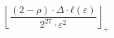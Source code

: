 \[\left\lfloor \frac{\left(2 - \rho\right) \cdot \Delta \cdot ℓ\left(\varepsilon\right)}{2^{27} \cdot \varepsilon^{2}} \right\rfloor_{+}\]
